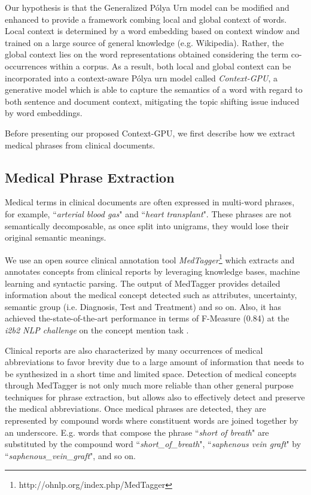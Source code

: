 \documentclass[letterpaper]{article}
\begin{document}
Our hypothesis is that the Generalized P\'{o}lya Urn model can be modified and enhanced to provide a framework combing local and global context of words. Local context is determined by a word embedding based on context window and trained on a large source of general knowledge (e.g. Wikipedia).
Rather, the global context lies on the word representations obtained considering the term co-occurrences within a corpus. As a result, both local and global context can be incorporated into a context-aware P\'{o}lya urn model called \textit{Context-GPU}, a generative model which is able to capture the semantics of a word with regard to both sentence and document context, mitigating the topic shifting issue induced by word embeddings. %

Before presenting our proposed Context-GPU, we first describe how we extract medical phrases from clinical documents.



\subsection{Medical Phrase Extraction}

Medical terms in clinical documents are often expressed in multi-word phrases, for example, ``\textit{arterial blood gas}" and ``\textit{heart transplant}". These phrases are not semantically decomposable, as once split into unigrams, they would lose their original semantic meanings.

We use an open source clinical annotation tool \textit{MedTagger}\footnote{http://ohnlp.org/index.php/MedTagger} which extracts and annotates concepts from clinical reports by leveraging knowledge bases, machine learning and syntactic parsing. The output of MedTagger provides detailed information about the medical concept detected such as attributes, uncertainty, semantic group (i.e. Diagnosis, Test and Treatment) and so on. Also, it has achieved the-state-of-the-art performance in terms of F-Measure (0.84) at the \textit{i2b2 NLP challenge} on the concept mention task \cite{liu12}.

Clinical reports are also characterized by many occurrences of medical abbreviations to favor brevity due to a large amount of information that needs to be synthesized in a short time and limited space. Detection of medical concepts through MedTagger is not only much more reliable than other general purpose techniques for phrase extraction, but allows also to effectively detect and preserve the medical abbreviations.
Once medical phrases are detected, they are represented by compound words where constituent words are joined together by an underscore. E.g. words that compose the phrase ``\textit{short of breath}" are substituted by the compound word ``\textit{short\_of\_breath}", ``\textit{saphenous vein graft}" by ``\textit{saphenous\_vein\_graft}", and so on.
\end{document}
